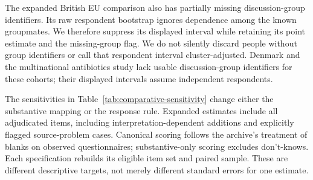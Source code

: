 The expanded British EU comparison also has partially missing discussion-group identifiers. Its raw respondent bootstrap ignores dependence among the known groupmates. We therefore suppress its displayed interval while retaining its point estimate and the missing-group flag. We do not silently discard people without group identifiers or call that respondent interval cluster-adjusted. Denmark and the multinational antibiotics study lack usable discussion-group identifiers for these cohorts; their displayed intervals assume independent respondents.

\begin{table}[H]
\centering\small
\caption{Bootstrap support for the primary policy comparison.}
\label{tab:comparative-support}

\end{table}

The sensitivities in Table~\ref{tab:comparative-sensitivity} change either the substantive mapping or the response rule. Expanded estimates include all adjudicated items, including interpretation-dependent additions and explicitly flagged source-problem cases. Canonical scoring follows the archive's treatment of blanks on observed questionnaires; substantive-only scoring excludes don't-knows. Each specification rebuilds its eligible item set and paired sample. These are different descriptive targets, not merely different standard errors for one estimate.

\begin{table}[H]
\centering\scriptsize
\setlength{\tabcolsep}{3pt}
\caption{Differences in gains under alternative item and response rules.}
\label{tab:comparative-sensitivity}

\end{table}

